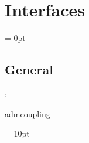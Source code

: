 
\section{Interfaces} 


\parskip = 0pt

\vspace{3mm} \subsection*{General}

: 

admcoupling
\vspace{2mm}

\vspace{5mm}\parskip = 10pt 
